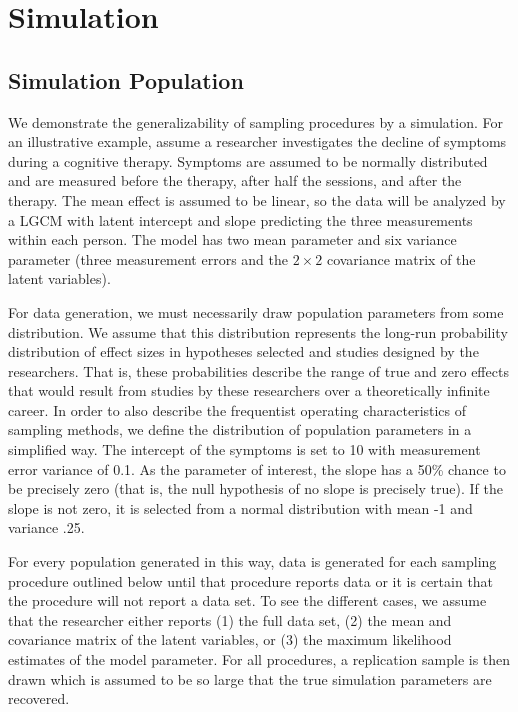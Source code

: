 \documentclass[man]{apa7}
\theoremstyle{definition}
\begin{document}
\section{Simulation}
\subsection{Simulation Population}
We demonstrate the generalizability of sampling procedures by a simulation. For an illustrative example, assume a researcher investigates the decline of symptoms during a cognitive therapy. Symptoms are assumed to be normally distributed and are measured before the therapy, after half the sessions, and after the therapy. The mean effect is assumed to be linear, so the data will be analyzed by a LGCM with latent intercept and slope predicting the three measurements within each person. The model has two mean parameter and six variance parameter (three measurement errors and the $2\times2$ covariance matrix of the latent variables). 

For data generation, we must necessarily draw population parameters from some distribution.  We assume that this distribution represents the long-run probability distribution of effect sizes in hypotheses selected and studies designed by the researchers.  That is, these probabilities describe the range of true and zero effects that would result from studies by these researchers over a theoretically infinite career.  In order to also describe the frequentist operating characteristics of sampling methods, we define the distribution of population parameters in a simplified way. The intercept of the symptoms is set to 10 with measurement error variance of 0.1.  As the parameter of interest, the slope has a 50\% chance to be precisely zero (that is, the null hypothesis of no slope is precisely true).  If the slope is not zero, it is selected from a normal distribution with mean -1 and variance .25.

For every population generated in this way, data is generated for each sampling procedure outlined below until that procedure reports data or it is certain that the procedure will not report a data set. To see the different cases, we assume that the researcher either reports (1) the full data set, (2) the mean and covariance matrix of the latent variables, or (3) the maximum likelihood estimates of the model parameter. For all procedures, a replication sample is then drawn which is assumed to be so large that the true simulation parameters are recovered. 
\end{document}
